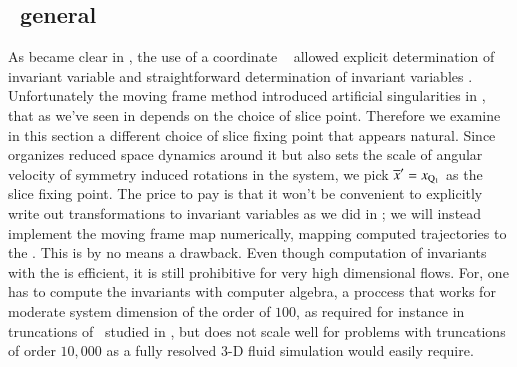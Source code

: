 
\subsection{\label{s:mfReqb}\CLe\  general \slice}

As became clear in , the use of a coordinate \slice\ 
allowed explicit determination of invariant variable  and straightforward
determination of invariant variables . Unfortunately the moving frame
method introduced artificial singularities in \reducedsp, that as we've seen in 
depends on the choice of slice point.
Therefore we examine in this section a different choice of slice fixing point that appears natural.
Since  organizes reduced space dynamics around it but also sets the
scale of angular velocity of symmetry induced rotations in the system, we
pick ${\overline{x}'}=x_{\mathrm{Q}_{1}}$ as the slice fixing point.
The price to pay is that it won't be convenient to explicitly write out
transformations to invariant variables
as we did in ; we will instead implement the moving frame map numerically,
mapping computed trajectories to the \slice.
This is by no means a drawback. Even though computation of invariants with the
{\mframes} is efficient, it is still
prohibitive for very high dimensional flows. For, one has
to compute the invariants with computer algebra, a proccess
that works for moderate system dimension of the order of $100$,
as required for instance in truncations of \KSe\ studied in ,
but does not scale well for problems with truncations of order $10,000$ as
a fully resolved $3$-D fluid simulation would easily require.

